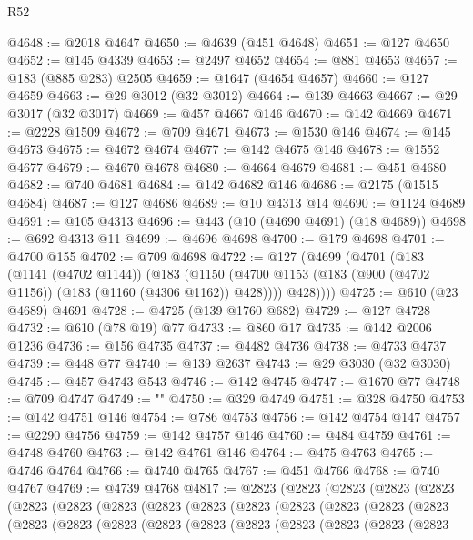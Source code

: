 \begin{lexlean}{R52}
\begin{coremodule}
@4648 := @2018 @4647
@4650 := @4639 (@451 @4648)
@4651 := @127 @4650
@4652 := @145 @4339
@4653 := @2497 @4652
@4654 := @881 @4653
@4657 := @183 (@885 @283) @2505
@4659 := @1647 (@4654 @4657)
@4660 := @127 @4659
@4663 := @29 @3012 (@32 @3012)
@4664 := @139 @4663
@4667 := @29 @3017 (@32 @3017)
@4669 := @457 @4667 @146
@4670 := @142 @4669
@4671 := @2228 @1509
@4672 := @709 @4671
@4673 := @1530 @146
@4674 := @145 @4673
@4675 := @4672 @4674
@4677 := @142 @4675 @146
@4678 := @1552 @4677
@4679 := @4670 @4678
@4680 := @4664 @4679
@4681 := @451 @4680
@4682 := @740 @4681
@4684 := @142 @4682 @146
@4686 := @2175 (@1515 @4684)
@4687 := @127 @4686
@4689 := @10 @4313 @14
@4690 := @1124 @4689
@4691 := @105 @4313
@4696 := @443 (@10 (@4690 @4691) (@18 @4689))
@4698 := @692 @4313 @11
@4699 := @4696 @4698
@4700 := @179 @4698
@4701 := @4700 @155
@4702 := @709 @4698
@4722 := @127
    (@4699
      (@4701
        (@183
          (@1141 (@4702 @1144))
          (@183
            (@1150 (@4700 @1153 (@183 (@900 (@4702 @1156)) (@183 (@1160 (@4306 @1162)) @428))))
            @428))))
@4725 := @610 (@23 @4689) @4691
@4728 := @4725 (@139 @1760 @682)
@4729 := @127 @4728
@4732 := @610 (@78 @19) @77
@4733 := @860 @17
@4735 := @142 @2006 @1236
@4736 := @156 @4735
@4737 := @4482 @4736
@4738 := @4733 @4737
@4739 := @448 @77
@4740 := @139 @2637
@4743 := @29 @3030 (@32 @3030)
@4745 := @457 @4743 @543
@4746 := @142 @4745
@4747 := @1670 @77
@4748 := @709 @4747
@4749 := "\n"
@4750 := @329 @4749
@4751 := @328 @4750
@4753 := @142 @4751 @146
@4754 := @786 @4753
@4756 := @142 @4754 @147
@4757 := @2290 @4756
@4759 := @142 @4757 @146
@4760 := @484 @4759
@4761 := @4748 @4760
@4763 := @142 @4761 @146
@4764 := @475 @4763
@4765 := @4746 @4764
@4766 := @4740 @4765
@4767 := @451 @4766
@4768 := @740 @4767
@4769 := @4739 @4768
@4817 := @2823
    (@2823
      (@2823
        (@2823
          (@2823
            (@2823
              (@2823
                (@2823
                  (@2823
                    (@2823
                      (@2823
                        (@2823
                          (@2823
                            (@2823
                              (@2823
                                (@2823
                                  (@2823
                                    (@2823
                                      (@2823
                                        (@2823
                                          (@2823
                                            (@2823
                                              (@2823
                                                (@2823
                                                  (@2823

\end{coremodule}
\end{lexlean}
